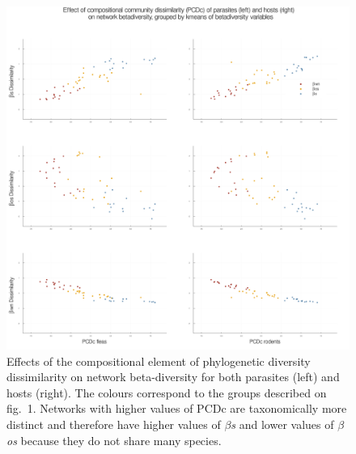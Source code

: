 \documentclass[11pt]{article}
\makeatletter
\def\maxwidth{\ifdim\Gin@nat@width>\linewidth\linewidth
\else\Gin@nat@width\fi}
\let\Oldincludegraphics\includegraphics
\renewcommand{\includegraphics}[1]{\Oldincludegraphics[width=\maxwidth]{#1}}
\makeatother
\begin{document}
\begin{figure}
\hypertarget{fig:twoA}{%
\centering
\includegraphics{figures/fig2A.png}
\caption{Effects of the compositional element of phylogenetic diversity
dissimilarity on network beta-diversity for both parasites (left) and
hosts (right). The colours correspond to the groups described on fig.~1.
Networks with higher values of PCDc are taxonomically more distinct and
therefore have higher values of \emph{\(\beta\)s} and lower values of
\emph{\(\beta\)os} because they do not share many
species.}\label{fig:twoA}
}
\end{figure}
\end{document}
